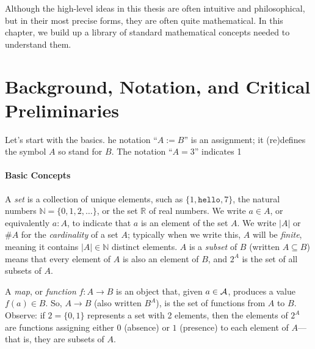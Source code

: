     \label{chap:prelim}

Although the high-level ideas in this thesis are often intuitive and philosophical, 
but in their most precise forms, they are often quite mathematical.
In this chapter, we build up a library of standard mathematical concepts needed to understand them. 

\section{Background, Notation, and Critical Preliminaries}

Let's start with the basics.
he notation ``$A := B$'' is an assignment; it (re)defines the symbol $A$ so stand for $B$.  The notation ``$A = 3$'' indicates 1

    \label{ref:prelim-basic}

\paragraph{Basic Concepts}
A \emph{set} is a collection of unique elements, 
    such as 
    $\{1, \texttt{hello}, 7\}$,
    the natural numbers $\mathbb N = \{0, 1, 2, \ldots \}$,
    or the set $\mathbb R$ of real numbers. 
We write $a \in A$, or equivalently $a : A$, 
    to indicate that $a$ is an element of the set $A$.
We write $|A|$ or $\# A$ for the \emph{cardinality} of a set $A$;
    typically when we write this,  $A$ will be \emph{finite}, 
    meaning it contains $|A| \in \mathbb N$ distinct elements. 
$A$ is a \emph{subset} of $B$ (written $A \subseteq B$) means that every element of $A$ is also an element of $B$, and $2^A$ is the set of all subsets of $A$.

A \emph{map}, or \emph{function} $f : A \to B$ is an object that, 
    given $a \in \mathcal A$, produces a value $f(a) \in B$. 
So, $A \to B$ (also written $B^A$), 
    is the set of functions from $A$ to $B$.
Observe: if $2 = \{ 0, 1\}$ represents a set with 2 elements, then 
    the elements of $2^A$ are functions assigning either $0$ (absence) or $1$ (presence) to each element of $A$---that is, they are subsets of $A$. 


